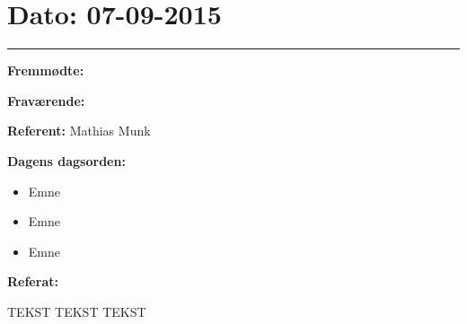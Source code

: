 \section{Dato: 07-09-2015}
\hrule

\textbf{Fremmødte:} 

\textbf{Fraværende:}

\textbf{Referent:} Mathias Munk

\textbf{Dagens dagsorden:}
\begin{itemize}
	\item Emne
	\item Emne
	\item Emne
\end{itemize}

\textbf{Referat:}

TEKST TEKST TEKST
